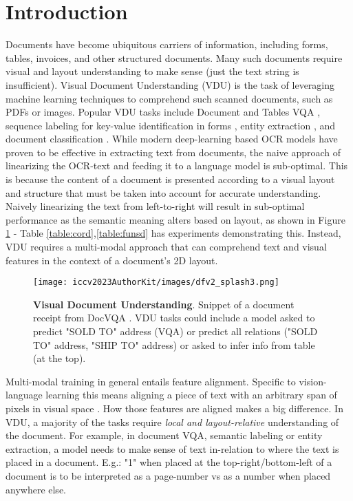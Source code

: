 \documentclass[10pt,twocolumn,letterpaper]{article}
\begin{document}
\section{Introduction}
\label{sec:intro}



Documents have become ubiquitous carriers of information, including forms, tables, invoices, and other structured documents. Many such documents require visual and layout understanding to make sense (just the text string is insufficient). Visual Document Understanding (VDU) is the task of leveraging machine learning techniques to comprehend such scanned documents, such as PDFs or images. Popular VDU tasks include Document and Tables VQA \cite{mathew2020docvqa,Chen2019TabFactAL}, sequence labeling for key-value identification in forms \cite{Jaume2019FUNSDAD}, entity extraction \cite{park2019cord}, and document classification \cite{harley2015icdar}. While modern deep-learning based OCR models \cite{litman2020scatter} have proven to be effective in extracting text from documents, the naive approach of linearizing the OCR-text and feeding it to a language model is sub-optimal. This is because the content of a document is presented according to a visual layout and structure that must be taken into account for accurate understanding. Naively linearizing the text from left-to-right will result in sub-optimal performance as the semantic meaning alters based on layout, as shown in Figure \ref{fig:splash} - Table \ref{table:cord},\ref{table:funsd} has experiments demonstrating this. Instead, VDU requires a multi-modal approach that can comprehend text and visual features in the context of a document's 2D layout.

\begin{figure}
  \centering
  \texttt{[image: iccv2023AuthorKit/images/dfv2\_splash3.png]}
  \caption{\textbf{Visual Document Understanding}. Snippet of a document receipt from DocVQA \cite{mathew2021docvqa}. VDU tasks could include a model asked to predict "SOLD TO" address (VQA) or predict all relations ("SOLD TO"  address, "SHIP TO"  address) or asked to infer info from table (at the top).
  }
  \label{fig:splash}
  \vspace{-5mm}
\end{figure}



Multi-modal training in general entails feature alignment. Specific to vision-language learning this means aligning a piece of text with an arbitrary span of pixels in visual space \cite{hoyoro,Kim2021ViLTVT,CLIPRadford2021LearningTV,wang2022git,Alayrac2022FlamingoAV,biten2022latr,appalaraju2021docformer,Hao2022MixGenAN,appalaraju2020towards,Li2022SeeTek,Chen2022PaLI}. How those features are aligned makes a big difference. In VDU, a majority of the tasks require \textit{local and layout-relative} understanding of the document. For example, in document VQA, semantic labeling or entity extraction, a model needs to make sense of text in-relation to where the text is placed in a document. E.g.: "1" when placed at the top-right/bottom-left of a document is to be interpreted as a page-number vs as a number when placed anywhere else. 
\end{document}
